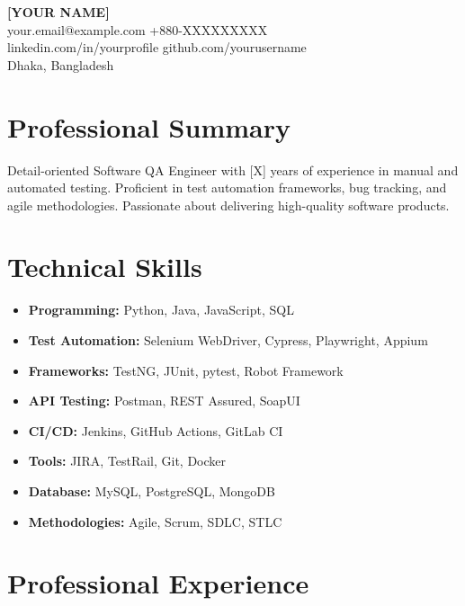 \documentclass[11pt,a4paper]{article}
\begin{document}
\begin{center}
    {\LARGE\bfseries\color{dark} [YOUR NAME]}\\[6pt]
    {\color{primary}  your.email@example.com \quad {} +880-XXXXXXXXX}\\
    {\color{primary}  linkedin.com/in/yourprofile \quad {} github.com/yourusername}\\
    {\color{primary}  Dhaka, Bangladesh}
\end{center}

\section{Professional Summary}
Detail-oriented Software QA Engineer with [X] years of experience in manual and automated testing. Proficient in test automation frameworks, bug tracking, and agile methodologies. Passionate about delivering high-quality software products.

\section{Technical Skills}
\begin{itemize}[leftmargin=*, nosep]
    \item \textbf{Programming:} Python, Java, JavaScript, SQL
    \item \textbf{Test Automation:} Selenium WebDriver, Cypress, Playwright, Appium
    \item \textbf{Frameworks:} TestNG, JUnit, pytest, Robot Framework
    \item \textbf{API Testing:} Postman, REST Assured, SoapUI
    \item \textbf{CI/CD:} Jenkins, GitHub Actions, GitLab CI
    \item \textbf{Tools:} JIRA, TestRail, Git, Docker
    \item \textbf{Database:} MySQL, PostgreSQL, MongoDB
    \item \textbf{Methodologies:} Agile, Scrum, SDLC, STLC
\end{itemize}

\section{Professional Experience}
\end{document}
